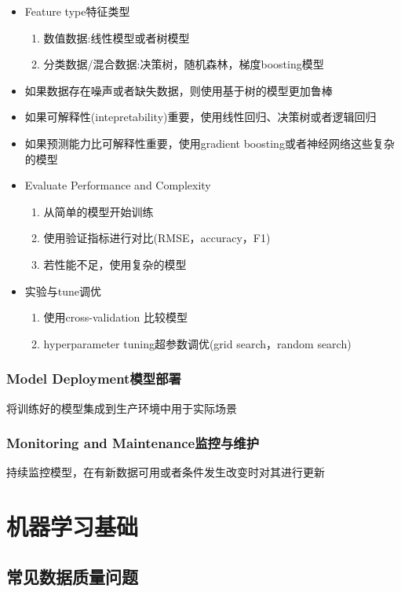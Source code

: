 \documentclass[UTF8]{ctexart}
\begin{document}
\begin{itemize}
    \item Feature type特征类型
    \begin{enumerate}
        \item 数值数据:线性模型或者树模型
        \item 分类数据/混合数据:决策树，随机森林，梯度boosting模型
    \end{enumerate}
    \item 如果数据存在噪声或者缺失数据，则使用基于树的模型更加鲁棒
    \item 如果可解释性(intepretability)重要，使用线性回归、决策树或者逻辑回归
    \item 如果预测能力比可解释性重要，使用gradient boosting或者神经网络这些复杂的模型
    \item Evaluate Performance and Complexity
    \begin{enumerate}
        \item 从简单的模型开始训练
        \item 使用验证指标进行对比(RMSE，accuracy，F1)
        \item 若性能不足，使用复杂的模型
    \end{enumerate}
    \item 实验与tune调优
    \begin{enumerate}
        \item 使用cross-validation 比较模型
        \item hyperparameter tuning超参数调优(grid search，random search)
    \end{enumerate}
\end{itemize}
\subsubsection{Model Deployment模型部署}
将训练好的模型集成到生产环境中用于实际场景
\subsubsection{Monitoring and Maintenance监控与维护}
持续监控模型，在有新数据可用或者条件发生改变时对其进行更新

\section{机器学习基础}

\subsection{常见数据质量问题}
\end{document}
